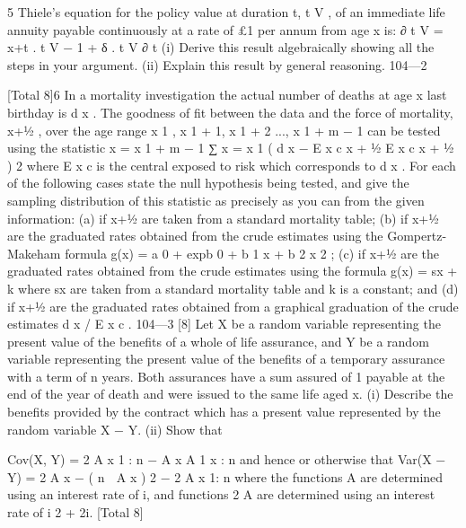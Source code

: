 5
Thiele’s equation for the policy value at duration t, t V , of an immediate life
annuity payable continuously at a rate of £1 per annum from age x is:
∂
t V = \mu x+t . t V − 1 + δ . t V
∂ t
(i) Derive this result algebraically showing all the steps in your
argument.
(ii) Explain this result by general reasoning.
104—2



[Total 8]6
In a mortality investigation the actual number of deaths at age x last birthday
is d x . The goodness of fit between the data and the force of mortality, \mu x+1⁄2 ,
over the age range x 1 , x 1 + 1, x 1 + 2 ..., x 1 + m − 1 can be tested using the
statistic
x = x 1 + m − 1
∑
x = x 1
( d
x
− E x c \mu x + 1⁄2
E x c \mu x + 1⁄2
)
2
where E x c is the central exposed to risk which corresponds to d x .
For each of the following cases state the null hypothesis being tested, and give
the sampling distribution of this statistic as precisely as you can from the
given information:
(a) if \mu x+1⁄2 are taken from a standard mortality table;
(b) if \mu x+1⁄2 are the graduated rates obtained from the crude estimates using
the Gompertz-Makeham formula
g(x) = a 0 + exp{b 0 + b 1 x + b 2 x 2 };
(c)
if \mu x+1⁄2 are the graduated rates obtained from the crude estimates using
the formula
g(x) = \mu sx + k
where \mu sx are taken from a standard mortality table and k is a constant;
and
(d)
if \mu x+1⁄2 are the graduated rates obtained from a graphical graduation of
the crude estimates d x / E x c .
104—3
[8]
Let X be a random variable representing the present value of the benefits of a
whole of life assurance, and Y be a random variable representing the present
value of the benefits of a temporary assurance with a term of n years. Both
assurances have a sum assured of 1 payable at the end of the year of death and
were issued to the same life aged x.
(i) Describe the benefits provided by the contract which has a present
value represented by the random variable X − Y.
(ii) Show that

Cov(X, Y) = 2 A x 1 : n − A x A 1 x : n
and hence or otherwise that
Var(X − Y) = 2 A x − ( n  A x ) 2 − 2 A x 1: n
where the functions A are determined using an interest rate of i, and
functions 2 A are determined using an interest rate of i 2 + 2i.
[Total 8]



